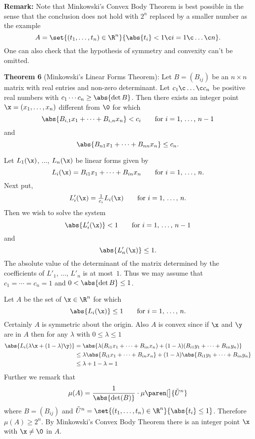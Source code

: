 \textbf{Remark:} Note that Minkowski's Convex Body Theorem is best possible in the sense that the conclusion does not hold with $2^n$ replaced by a smaller number as the example
\[ A = \set{(t_1,\dotsc,t_n)\in\R^n}{\abs{t_i}<1\c i=1\c \dotsc\c n} . \]
One can also check that the hypothesis of symmetry and convexity can't be omitted.

\textbf{Theorem 6} (Minkowski's Linear Forms Theorem):  Let $B=(B_{ij})$ be an $n\times n$ matrix with real entries and non-zero determinant.  Let $c_1\c \dotsc\c c_n$ be positive real numbers with $c_1\dotsm c_n\geq\abs{\det B}$.  Then there exists an integer point $\x=(x_1,\dotsc,x_n)$ different from $\0$ for which
\[ \abs{B_{i,1}x_1+\dotsb+B_{i,n}x_n} < c_i \qquad\text{for $i=1$, $\dotsc$, $n-1$} \]
and
\[ \abs{B_{n1}x_1+\dotsb+B_{nn}x_n} \leq c_n . \]

\pf Let $L_1(\x)$, $\dotsc$, $L_n(\x)$ be linear forms given by
\[ L_i(\x) = B_{i1}x_1 + \dotsb + B_{in}x_n \qquad\text{for $i=1$, $\dotsc$, $n$} . \]
Next put,
\[ L'_i(\x) = \tfrac{1}{c_i}L_i(\x) \qquad\text{for $i=1$, $\dotsc$, $n$} . \]
Then we wish to solve the system
\[ \abs{L'_i(\x)} < 1 \qquad\text{for $i=1$, $\dotsc$, $n-1$} \]
and
\[ \abs{L'_n(\x)} \leq 1 . \]
The absolute value of the determinant of the matrix determined by the coefficients of $L'_1$, $\dotsc$, $L'_n$ is at most~$1$.  Thus we may assume that $c_1=\dotsb=c_n=1$ and $0<\abs{\det B}\leq1$.

Let $A$ be the set of $\x\in\R^n$ for which
\[ \abs{L_i(\x)}\leq 1 \qquad\text{for $i=1$, $\dotsc$, $n$} . \]
Certainly $A$ is symmetric about the origin.  Also $A$ is convex since if $\x$ and $\y$ are in $A$ then for any $\lambda$ with $0\leq\lambda\leq1$
\begin{align*}
\abs{L_i(\lambda\x+(1-\lambda)\y)} &= \abs{\lambda(B_{i1}x_1+\dotsb+B_{in}x_n)+(1-\lambda)(B_{i1}y_1+\dotsb+B_{in}y_n)} \\
&\leq \lambda \abs{B_{i1}x_1+\dotsb+B_{in}x_n} + (1-\lambda) \abs{B_{i1}y_1+\dotsb+B_{in}y_n} \\
&\leq \lambda + 1 - \lambda = 1
\end{align*}
Further we remark that
\[ \mu(A) = \frac{1}{\abs{\det(B)}}\cdot\mu\paren[\big]{\tilde U^n} \]
where $B=(B_{ij})$ and $\tilde U^n=\set{(t_1,\dotsc,t_n)\in\R^n}{\abs{t_i}\leq1}$.  Therefore $\mu(A)\geq2^n$.  By Minkowski's Convex Body Theorem there is an integer point $\x$ with $\x\neq\0$ in $A$.

